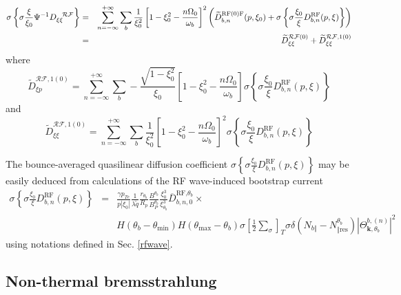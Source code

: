 \begin{eqnarray}
\sigma \left\{ \sigma \frac{\xi }{\xi _{0}}\Psi ^{-1}D_{\xi \xi }^{\mathcal{%
\ \ RF}}\right\} &=&\sum_{n=-\infty }^{+\infty }\sum_{b}\frac{1}{\xi _{0}^{2}%
}\left[ 1-\xi _{0}^{2}-\frac{n\Omega _{0}}{\omega _{b}}\right] ^{2}\left(
\widetilde{D}_{b,n}^{\text{RF}(0)\text{F}}(p,\xi _{0})+\sigma \left\{ \sigma
\frac{\xi _{0}}{\xi }D_{b,n}^{\text{RF}}(p,\xi )\right\} \right)  \nonumber
\\
&=&\widetilde{D}_{\xi \xi }^{\mathcal{RF}\left( 0\right) }+\widetilde{D}
_{\xi \xi }^{\mathcal{RF},1\left( 0\right) }
\end{eqnarray}
where
\begin{equation}
\widetilde{D}_{\xi p}^{\mathcal{RF},1\left( 0\right) }=\sum_{n=-\infty
}^{+\infty }\sum_{b}-\frac{\sqrt{1-\xi _{0}^{2}}}{\xi _{0}}\left[ 1-\xi
_{0}^{2}-\frac{n\Omega _{0}}{\omega _{b}}\right] \sigma \left\{ \sigma \frac{
\xi _{0}}{\xi }D_{b,n}^{\text{RF}}(p,\xi )\right\}
\end{equation}
and
\begin{equation}
\widetilde{D}_{\xi \xi }^{\mathcal{RF},1\left( 0\right) }=\sum_{n=-\infty
}^{+\infty }\sum_{b}\frac{1}{\xi _{0}^{2}}\left[ 1-\xi _{0}^{2}-\frac{
n\Omega _{0}}{\omega _{b}}\right] ^{2}\sigma \left\{ \sigma \frac{\xi _{0}}{
\xi }D_{b,n}^{\text{RF}}(p,\xi )\right\}
\end{equation}

The bounce-averaged quasilinear diffusion coefficient $\sigma \left\{ \sigma
\frac{\xi _{0}}{\xi }D_{b,n}^{\text{RF}}(p,\xi )\right\} $ may be easily
deduced from calculations of the RF wave-induced bootstrap current
\begin{eqnarray}
\sigma \left\{ \sigma \frac{\xi _{0}}{\xi }D_{b,n}^{\text{RF}}(p,\xi
)\right\} &=&\frac{\gamma p_{Te}}{p\left| \xi _{0}\right| }\frac{1}{\lambda
\widetilde{q}}\frac{r_{\theta _{b}}}{R_{p}}\frac{B^{\theta _{b}}}{
B_{P}^{\theta _{b}}}\frac{\xi _{0}^{3}}{\xi _{\theta _{b}}^{3}}\overline{D}
_{b,n,0}^{\text{RF,}\theta _{b}}\times  \nonumber \\
&&H\left( \theta _{b}-\theta _{\min }\right) H\left( \theta _{\max }-\theta
_{b}\right) \sigma \left[ \frac{1}{2}\sum\limits_{\sigma }\right] _{T}\sigma
\delta \left( N_{b\Vert }-N_{\Vert \text{res}}^{\theta _{b}}\right) \left|
\Theta _{\mathbf{k,}\theta _{b}}^{b,\left( n\right) }\right| ^{2}
\end{eqnarray}
using notations defined in Sec. \ref{rfwave}.

\subsection{Non-thermal bremsstrahlung}

